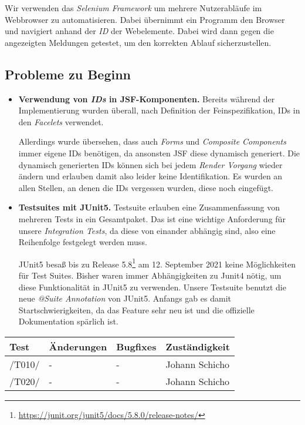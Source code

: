 
Wir verwenden das \emph{Selenium Framework} um mehrere Nutzerabläufe im Webbrowser zu automatisieren.
Dabei übernimmt ein Programm den Browser und navigiert anhand der \emph{ID}
der Webelemente. Dabei wird dann gegen die angezeigten Meldungen getestet, um
den korrekten Ablauf sicherzustellen.

\subsection{Probleme zu Beginn}

\begin{itemize}
	\item \textbf{Verwendung von \emph{IDs} in JSF-Komponenten.} Bereits während der
	Implementierung wurden überall, nach Definition der Feinspezifikation, IDs in den \emph{Facelets} verwendet.

	Allerdings wurde übersehen, dass auch \emph{Forms} und \emph{Composite Components} immer eigene IDs benötigen, da ansonsten JSF diese dynamisch
	generiert. Die dynamisch generierten IDs können sich bei jedem \emph{Render Vorgang} wieder ändern und erlauben damit also leider keine Identifikation.\newline
	Es wurden an allen Stellen, an denen die IDs vergessen wurden, diese noch eingefügt.

	\item \textbf{Testsuites mit JUnit5.} Testsuite erlauben eine Zusammenfassung von mehreren Tests in ein Gesamtpaket. Das ist eine wichtige
	Anforderung für unsere \emph{Integration Tests}, da diese von einander abhängig sind, also eine Reihenfolge festgelegt werden muss.

	JUnit5 besaß bis zu Release 5.8\footnote{\url{https://junit.org/junit5/docs/5.8.0/release-notes/}}
	am 12. September 2021 keine Möglichkeiten für Test Suites. Bisher waren immer Abhängigkeiten zu Junit4 nötig, um diese
	Funktionalität in JUnit5 zu verwenden. Unsere Testsuite benutzt die neue
	\emph{@Suite Annotation} von JUnit5. Anfangs gab es damit Startschwierigkeiten, da das Feature sehr neu ist und die offizielle
	Dokumentation spärlich ist.
\end{itemize}

\begin{table}
	\centering
	\begin{tabular}{m{1.2cm}|m{4.5cm}|m{4.5cm}|l}
		\toprule
		\textbf{Test} & \textbf{Änderungen} & \textbf{Bugfixes} & \textbf{Zuständigkeit} \\\midrule
		/T010/ & - & - & Johann Schicho \\\midrule
		/T020/ & - & - & Johann Schicho \\
	\end{tabular}
\end{table}

